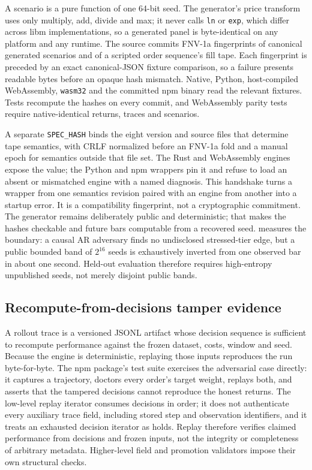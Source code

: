 A scenario is a pure function of one 64-bit seed. The generator's price transform uses only multiply, add, divide and max; it never calls \texttt{ln} or \texttt{exp}, which differ across libm implementations, so a generated panel is byte-identical on any platform and any runtime. The source commits FNV-1a fingerprints of canonical generated scenarios and of a scripted order sequence's fill tape. Each fingerprint is preceded by an exact canonical-JSON fixture comparison, so a failure presents readable bytes before an opaque hash mismatch. Native, Python, host-compiled WebAssembly, \texttt{wasm32} and the committed npm binary read the relevant fixtures. Tests recompute the hashes on every commit, and WebAssembly parity tests require native-identical returns, traces and scenarios.

A separate \texttt{SPEC\_HASH} binds the eight version and source files that determine tape semantics, with CRLF normalized before an FNV-1a fold and a manual epoch for semantics outside that file set. The Rust and WebAssembly engines expose the value; the Python and npm wrappers pin it and refuse to load an absent or mismatched engine with a named diagnosis. This handshake turns a wrapper from one semantics revision paired with an engine from another into a startup error. It is a compatibility fingerprint, not a cryptographic commitment. The generator remains deliberately public and deterministic; that makes the hashes checkable and future bars computable from a recovered seed.  measures the boundary: a causal AR adversary finds no undisclosed stressed-tier edge, but a public bounded band of $2^{16}$ seeds is exhaustively inverted from one observed bar in about one second. Held-out evaluation therefore requires high-entropy unpublished seeds, not merely disjoint public bands.

\subsection{Recompute-from-decisions tamper evidence}\label{sec:replay}

A rollout trace is a versioned JSONL artifact whose decision sequence is sufficient to recompute performance against the frozen dataset, costs, window and seed. Because the engine is deterministic, replaying those inputs reproduces the run byte-for-byte. The npm package's test suite exercises the adversarial case directly: it captures a trajectory, doctors every order's target weight, replays both, and asserts that the tampered decisions cannot reproduce the honest returns. The low-level replay iterator consumes decisions in order; it does not authenticate every auxiliary trace field, including stored step and observation identifiers, and it treats an exhausted decision iterator as holds. Replay therefore verifies claimed performance from decisions and frozen inputs, not the integrity or completeness of arbitrary metadata. Higher-level field and promotion validators impose their own structural checks.

